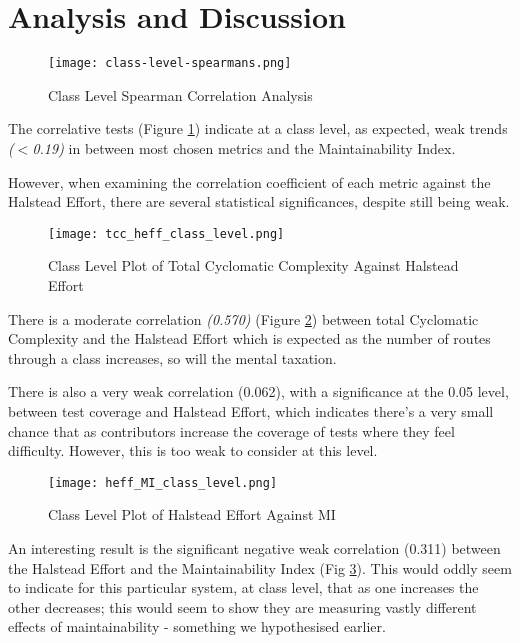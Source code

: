\section{Analysis and Discussion}

\begin{figure}[H]
	\texttt{[image: class-level-spearmans.png]}
	\caption{Class Level Spearman Correlation Analysis}
	\label{fig:classLevelSpearmans}  
\end{figure}

The correlative tests (Figure \ref{fig:classLevelSpearmans}) indicate at a class level, as expected, weak trends \textit{($<$0.19)} in between most chosen metrics and the Maintainability Index. 

However, when examining the correlation coefficient of each metric against the Halstead Effort, there are several statistical significances, despite still being weak. 

\begin{figure}[H]
	\texttt{[image: tcc\_heff\_class\_level.png]}
	\caption{Class Level Plot of Total Cyclomatic Complexity Against Halstead Effort}
	\label{fig:tccHeffClassLevel}  
\end{figure}

There is a moderate correlation \textit{(0.570)} (Figure \ref{fig:tccHeffClassLevel}) between total Cyclomatic Complexity and the Halstead Effort which is expected as the number of routes through a class increases, so will the mental taxation.

There is also a very weak correlation (0.062), with a significance at the 0.05 level, between test coverage and Halstead Effort, which indicates there's a very small chance that as contributors increase the coverage of tests where they feel difficulty. However, this is too weak to consider at this level.

\begin{figure}[H]
	\texttt{[image: heff\_MI\_class\_level.png]}
	\caption{Class Level Plot of Halstead Effort Against MI}
	\label{fig:heffMIClassLevel}  
\end{figure}

An interesting result is the significant negative weak correlation (0.311) between the Halstead Effort and the Maintainability Index (Fig \ref{fig:heffMIClassLevel}). This would oddly seem to indicate for this particular system, at class level, that as one increases the other decreases; this would seem to show they are measuring vastly different effects of maintainability - something we hypothesised earlier.

